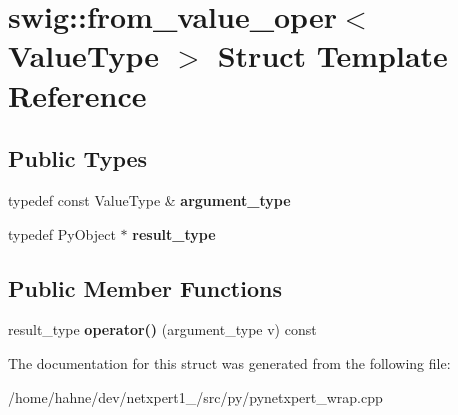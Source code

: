 \hypertarget{structswig_1_1from__value__oper}{}\section{swig\+:\+:from\+\_\+value\+\_\+oper$<$ Value\+Type $>$ Struct Template Reference}
\label{structswig_1_1from__value__oper}
\subsection*{Public Types}
\begin{DoxyCompactItemize}
\item 
typedef const Value\+Type \& {\bfseries argument\+\_\+type}\hypertarget{structswig_1_1from__value__oper_a0795f6ec6d52f5782097a674c6d24d18}{}\label{structswig_1_1from__value__oper_a0795f6ec6d52f5782097a674c6d24d18}

\item 
typedef Py\+Object $\ast$ {\bfseries result\+\_\+type}\hypertarget{structswig_1_1from__value__oper_a2599f8d784c6f2cdbe22b72611c367a9}{}\label{structswig_1_1from__value__oper_a2599f8d784c6f2cdbe22b72611c367a9}

\end{DoxyCompactItemize}
\subsection*{Public Member Functions}
\begin{DoxyCompactItemize}
\item 
result\+\_\+type {\bfseries operator()} (argument\+\_\+type v) const \hypertarget{structswig_1_1from__value__oper_ab8e19e3b8ba9f966702f4b3773f831b1}{}\label{structswig_1_1from__value__oper_ab8e19e3b8ba9f966702f4b3773f831b1}

\end{DoxyCompactItemize}


The documentation for this struct was generated from the following file\+:\begin{DoxyCompactItemize}
\item 
/home/hahne/dev/netxpert1\+\_/src/py/pynetxpert\+\_\+wrap.\+cpp\end{DoxyCompactItemize}
